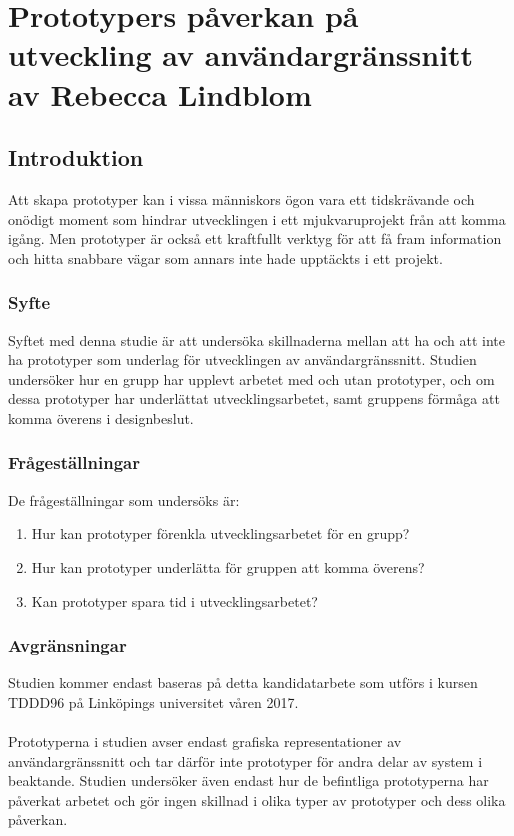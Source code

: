 \chapter{Prototypers påverkan på utveckling av användargränssnitt av Rebecca Lindblom}
\section{Introduktion}
\label{cha:rebecca-introduction}
Att skapa prototyper kan i vissa människors ögon vara ett tidskrävande och onödigt moment som hindrar utvecklingen i ett mjukvaruprojekt från att komma igång. Men prototyper är också ett kraftfullt verktyg för att få fram information och hitta snabbare vägar som annars inte hade upptäckts i ett projekt. 

\subsection{Syfte}
\label{sec:rebecca-purpose}
Syftet med denna studie är att undersöka skillnaderna mellan att ha och att inte ha prototyper som underlag för utvecklingen av användargränssnitt. Studien undersöker hur en grupp har upplevt arbetet med och utan prototyper, och om dessa prototyper har underlättat utvecklingsarbetet, samt gruppens förmåga att komma överens i designbeslut.

\subsection{Frågeställningar}
\label{sec:rebecca-research-questions}
De frågeställningar som undersöks är:
\begin{enumerate}
	\item Hur kan prototyper förenkla utvecklingsarbetet för en grupp?
	\item Hur kan prototyper underlätta för gruppen att komma överens?
	\item Kan prototyper spara tid i utvecklingsarbetet?
\end{enumerate}

\subsection{Avgränsningar}
\label{sec:rebecca-delimitations}
Studien kommer endast baseras på detta kandidatarbete som utförs i kursen TDDD96 på Linköpings universitet våren 2017. 
\\ \\
Prototyperna i studien avser endast grafiska representationer av användargränssnitt och tar därför inte prototyper för andra delar av system i beaktande. Studien undersöker även endast hur de befintliga prototyperna har påverkat arbetet och gör ingen skillnad i olika typer av prototyper och dess olika påverkan.

